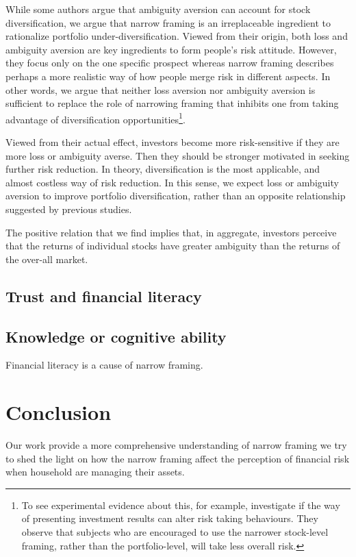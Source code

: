 \documentclass[ukenglish,nottitlepage,thmsb,11pt,letterpaper]{article}
\begin{document}
While some authors argue that ambiguity aversion can account for stock diversification,   we argue that narrow framing is an irreplaceable ingredient to rationalize portfolio under-diversification. Viewed from their origin, both loss and ambiguity aversion are key ingredients to form people's  risk attitude. However, they focus only on the one specific prospect whereas narrow framing describes perhaps a more realistic way of how people merge risk in different aspects. In other words, we argue that neither loss aversion nor ambiguity aversion is sufficient to replace the role of narrowing framing that inhibits one from taking advantage of diversification opportunities\footnote{To see experimental evidence about this, for example, \citet{Anagola2013} investigate if the way of presenting investment results can alter risk taking behaviours. They observe that subjects who are encouraged to use the narrower stock-level framing, rather than the portfolio-level, will take less overall risk.}.

Viewed from their actual effect, investors become more risk-sensitive if they are more loss or ambiguity averse. Then they should be stronger motivated in seeking further risk reduction. In theory, diversification is the most applicable, and almost costless way of risk reduction. In this sense, we expect loss or ambiguity aversion to improve portfolio diversification, rather than an opposite relationship suggested by previous studies.

The positive relation that we find implies that, in aggregate, investors perceive that the returns of individual stocks have greater ambiguity than the returns of the over-all market.

\subsection{Trust and financial literacy}
\subsection{Knowledge or cognitive ability}
Financial literacy is a cause of narrow framing.
\section{Conclusion}
Our work provide a more comprehensive understanding of narrow framing
we try to shed the light on how the narrow framing affect the perception of financial risk when household are managing their assets.

\newpage
\setlength{\bibsep}{0pt plus 1.5ex}


\end{document}
